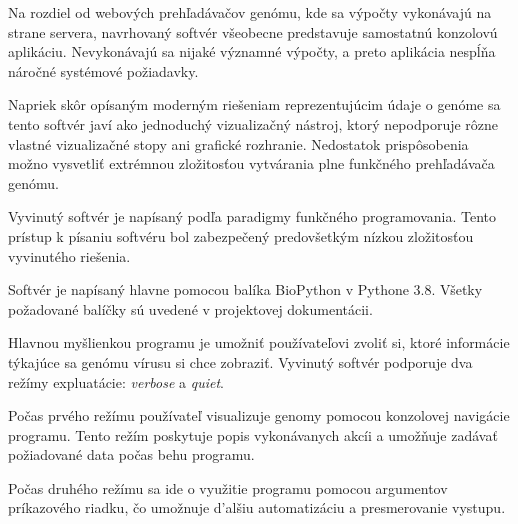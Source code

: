 Na rozdiel od webových prehľadávačov genómu, kde sa výpočty vykonávajú na strane servera, navrhovaný softvér všeobecne predstavuje samostatnú konzolovú aplikáciu.
Nevykonávajú sa nijaké významné výpočty, a preto aplikácia nespĺňa náročné systémové požiadavky.

Napriek skôr opísaným moderným riešeniam reprezentujúcim údaje o genóme sa tento softvér javí ako jednoduchý vizualizačný nástroj, ktorý nepodporuje rôzne vlastné vizualizačné stopy ani grafické rozhranie.
Nedostatok prispôsobenia možno vysvetliť extrémnou zložitosťou vytvárania plne funkčného prehľadávača genómu.

Vyvinutý softvér je napísaný podľa paradigmy funkčného programovania.
Tento prístup k písaniu softvéru bol zabezpečený predovšetkým nízkou zložitosťou vyvinutého riešenia.

Softvér je napísaný hlavne pomocou balíka BioPython v Pythone 3.8.
Všetky požadované balíčky sú uvedené v projektovej dokumentácii.

Hlavnou myšlienkou programu je umožniť používateľovi zvoliť si, ktoré informácie týkajúce sa genómu vírusu si chce zobraziť.
Vyvinutý softvér podporuje dva režímy expluatácie: \textit{verbose} a \textit{quiet}.

Počas prvého režímu používateľ visualizuje genomy pomocou konzolovej navigácie programu. 
Tento režím poskytuje popis vykonávanych akcíi a umožňuje zadávať požiadované data počas behu programu.

Počas druhého režímu sa ide o využitie programu pomocou argumentov príkazového riadku, čo umožnuje d'alšiu automatizáciu a presmerovanie vystupu.

